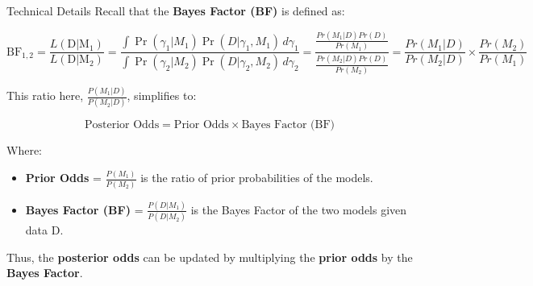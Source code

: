 \begin{frame}{Technical Details}
Recall that the \textbf{Bayes Factor (BF)} is defined as:

$$
\text{BF}_{1,2} = \frac{L(\text{D}|\text{M}_1)}{L(\text{D}|\text{M}_2)} ={\frac {\int \Pr(\gamma _{1}|M_{1})\Pr(D|\gamma _{1},M_{1})\,d\gamma _{1}}{\int \Pr(\gamma _{2}|M_{2})\Pr(D|\gamma _{2},M_{2})\,d\gamma _{2}}} = \frac{\frac{Pr(M_1|D)Pr(D)}{Pr(M_1)} }{\frac{Pr(M_2|D)Pr(D)}{Pr(M_2)}} = \frac{Pr(M_1|D)}{Pr(M_2|D)} \times \frac{Pr(M_2)}{Pr(M_1)}
$$

This ratio here, $\frac{P(M_1|D)}{P(M_2|D)}$, simplifies to:

$$
\text{Posterior Odds} = \text{Prior Odds} \times \text{Bayes Factor (BF)}
$$

Where:
\begin{itemize}
\item \textbf{Prior Odds} = $\frac{P(M_1)}{P(M_2)}$ is the ratio of prior probabilities of the models.
\item \textbf{Bayes Factor (BF)} = $\frac{P(D|M_1)}{P(D|M_2)}$ is the Bayes Factor of the two models given data $\text{D}$.
\end{itemize}

Thus, the \textbf{posterior odds} can be updated by multiplying the \textbf{prior odds} by the \textbf{Bayes Factor}.
\end{frame}

